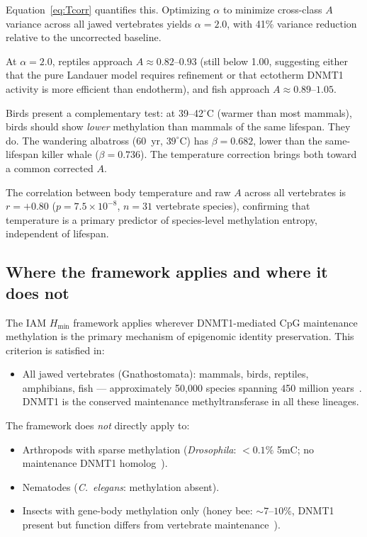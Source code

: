 \documentclass[11pt,a4paper]{article}
\newcommand{\Hmin}{H_{\min}}
\newcommand{\Ascore}{A}
\begin{document}
Equation~\eqref{eq:Tcorr} quantifies this. Optimizing $\alpha$ to minimize
cross-class $\Ascore$ variance across all jawed vertebrates yields $\alpha = 2.0$,
with 41\% variance reduction relative to the uncorrected baseline.

At $\alpha = 2.0$, reptiles approach $\Ascore \approx 0.82$--$0.93$
(still below 1.00, suggesting either that the pure Landauer model requires
refinement or that ectotherm DNMT1 activity is more efficient than endotherm),
and fish approach $\Ascore \approx 0.89$--$1.05$.

Birds present a complementary test: at 39--42$^\circ$C (warmer than most mammals),
birds should show \emph{lower} methylation than mammals of the same lifespan.
They do. The wandering albatross (60~yr, $39^\circ$C) has $\beta = 0.682$,
lower than the same-lifespan killer whale ($\beta = 0.736$). The temperature
correction brings both toward a common corrected $\Ascore$.

The correlation between body temperature and raw $\Ascore$ across all vertebrates
is $r = +0.80$ ($p = 7.5 \times 10^{-8}$, $n = 31$ vertebrate species),
confirming that temperature is a primary predictor of species-level methylation
entropy, independent of lifespan.

\subsection{Where the framework applies and where it does not}

The IAM $\Hmin$ framework applies wherever DNMT1-mediated CpG maintenance
methylation is the primary mechanism of epigenomic identity preservation.
This criterion is satisfied in:
\begin{itemize}
\item All jawed vertebrates (Gnathostomata): mammals, birds, reptiles, amphibians, fish
--- approximately 50,000 species spanning 450 million years~\citep{Kumar2017}.
DNMT1 is the conserved maintenance methyltransferase in all these lineages.
\end{itemize}

The framework does \emph{not} directly apply to:
\begin{itemize}
\item Arthropods with sparse methylation (\emph{Drosophila}: $<0.1\%$ 5mC;
no maintenance DNMT1 homolog~\citep{Lyko2018}).
\item Nematodes (\emph{C.\ elegans}: methylation absent).
\item Insects with gene-body methylation only (honey bee: $\sim 7$--$10\%$,
DNMT1 present but function differs from vertebrate maintenance~\citep{Lyko2010}).
\end{itemize}
\end{document}
